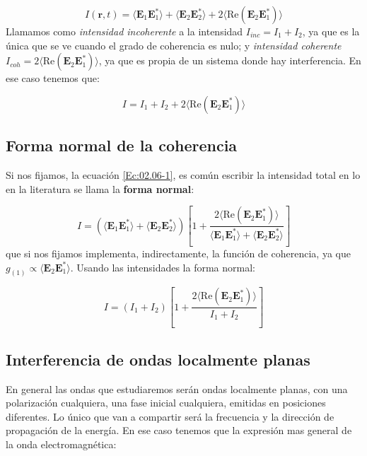 \documentclass[12pt,a4paper]{book}
\numberwithin{equation}{section}
\numberwithin{figure}{section}
\newcommand{\parentesis}[1]{\left( #1  \right)}
\newcommand{\ccorchetes}[1]{\left[ #1  \right]}
\newcommand{\1}{_{(1)}}
\newcommand{\2}{_{(2)}}
\newcommand{\Real}{\mathrm{Re} }
\newcommand{\rn}{\mathbf{r}}
\newcommand{\En}{\mathbf{E}}
\theoremstyle{definition}
\begin{document}
\begin{equation}
I (\rn,t) = \langle \En_1 \En_1^* \rangle  + \langle \En_2 \En_2^* \rangle  + 2  \langle  \Real (\En_2 \En_1^*) \rangle  \label{Ec:02.06-1}
\end{equation}
Llamamos como \textit{intensidad incoherente} a la intensidad $I_{inc}=I_1+I_2$, ya que es la única que se ve cuando el grado de coherencia es nulo; y \textit{intensidad coherente} $I_{coh} = 2 \langle  \Real (\En_2 \En_1^*) \rangle  $, ya que es propia de un sistema donde hay interferencia. En ese caso tenemos que:

\begin{equation}
I = I_1 + I_2 + 2  \langle  \Real (\En_2 \En_1^*) \rangle 
\end{equation}

\subsection{Forma normal de la coherencia} 

Si nos fijamos, la ecuación \ref{Ec:02.06-1}, es común escribir la intensidad total en lo en la literatura se llama la \textbf{forma normal}:

\begin{equation}
I = \parentesis{\langle \En_1 \En_1^* \rangle  + \langle \En_2 \En_2^* \rangle } \ccorchetes{1 + \frac{2  \langle  \Real (\En_2 \En_1^*) \rangle  }{\langle \En_1 \En_1^* \rangle  + \langle \En_2 \En_2^* \rangle }}
\end{equation}
que si nos fijamos implementa, indirectamente, la función de coherencia, ya que $g\1 \propto \langle  \En_2 \En_1^* \rangle$. Usando las intensidades la forma normal:

\begin{equation}
I = (I_1+I_2)\ccorchetes{1+\frac{2 \langle \Real (\En_2 \En_1^* ) \rangle  }{I_1 + I_2}}
\end{equation}



\subsection{Interferencia de ondas localmente planas}

En general las ondas que estudiaremos serán ondas localmente planas, con una polarización cualquiera, una fase inicial cualquiera, emitidas en posiciones diferentes. Lo único que van a compartir será la frecuencia y la dirección de propagación de la energía. En ese caso tenemos que la expresión mas general de la onda electromagnética:
\end{document}
